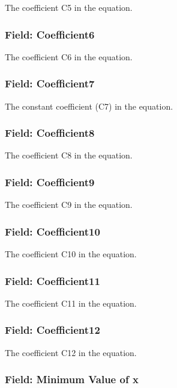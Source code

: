 The coefficient C5 in the equation.

\subsubsection{Field: Coefficient6}\label{field-coefficient6}

The coefficient C6 in the equation.

\subsubsection{Field: Coefficient7}\label{field-coefficient7}

The constant coefficient (C7) in the equation.

\subsubsection{Field: Coefficient8}\label{field-coefficient8}

The coefficient C8 in the equation.

\subsubsection{Field: Coefficient9}\label{field-coefficient9}

The coefficient C9 in the equation.

\subsubsection{Field: Coefficient10}\label{field-coefficient10}

The coefficient C10 in the equation.

\subsubsection{Field: Coefficient11}\label{field-coefficient11}

The coefficient C11 in the equation.

\subsubsection{Field: Coefficient12}\label{field-coefficient12}

The coefficient C12 in the equation.

\subsubsection{Field: Minimum Value of x}\label{field-minimum-value-of-x-9}

